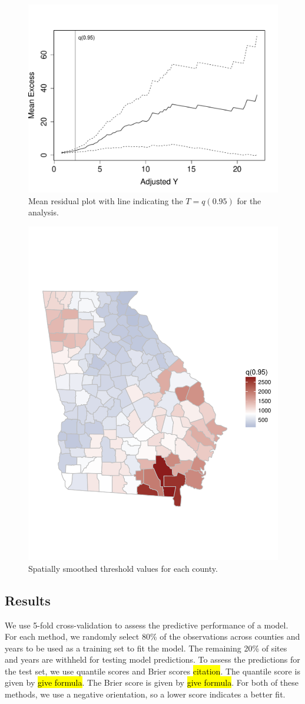 \documentclass[11pt]{article}
\begin{document}
\begin{figure}[htbp]
  \centering
  \includegraphics[width = 0.6\linewidth]{plots/mrl-zoom.pdf}  %
  \caption{Mean residual plot with line indicating the $T = q(0.95)$ for the analysis.}
  \label{fig:mrlthresh}
\end{figure}

\begin{figure}[htbp]
  \centering
  \includegraphics[width = 0.47\linewidth, trim = 0 10em 0 10em]{plots/spatial-q95.pdf}
  \caption{Spatially smoothed threshold values for each county.}
  \label{fig:mrlthresh}
\end{figure}

\subsection{Results}\label{s:results}
We use 5-fold cross-validation to assess the predictive performance of a model.
For each method, we randomly select 80\% of the observations across counties and years to be used as a training set to fit the model.
The remaining 20\% of sites and years are withheld for testing model predictions.
To assess the predictions for the test set, we use quantile scores and Brier scores \hl{citation}.
The quantile score is given by \hl{give formula}.
The Brier score is given by \hl{give formula}.
For both of these methods, we use a negative orientation, so a lower score indicates a better fit.
\end{document}
